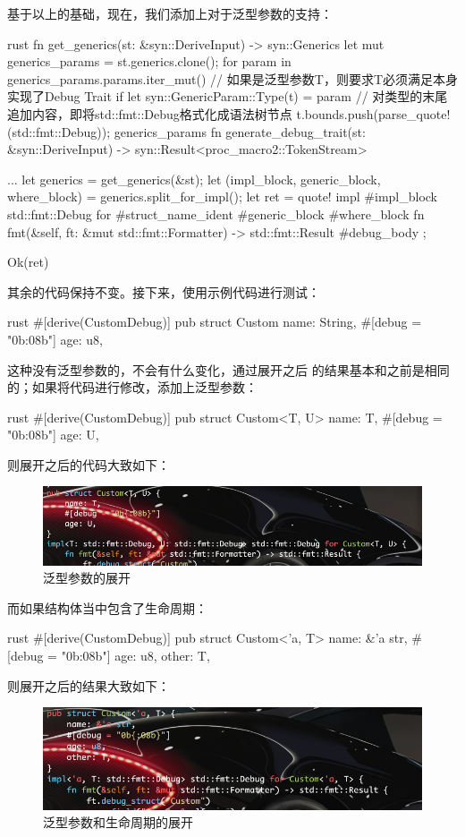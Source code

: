 基于以上的基础，现在，我们添加上对于泛型参数的支持：
\begin{code-block}{rust}
fn get_generics(st: &syn::DeriveInput) -> syn::Generics {
    let mut generics_params = st.generics.clone();
    for param in generics_params.params.iter_mut() {
        // 如果是泛型参数T，则要求T必须满足本身实现了Debug Trait
        if let syn::GenericParam::Type(t) = param {
            // 对类型的末尾追加内容，即将std::fmt::Debug格式化成语法树节点
            t.bounds.push(parse_quote!(std::fmt::Debug));
        }
    }
    generics_params
}
fn generate_debug_trait(st: &syn::DeriveInput) -> syn::Result<proc_macro2::TokenStream> {
    ...
    let generics = get_generics(&st);
    let (impl_block, generic_block, where_block) = generics.split_for_impl();
    let ret = quote! {
        impl #impl_block std::fmt::Debug for #struct_name_ident #generic_block #where_block {
            fn fmt(&self, ft: &mut std::fmt::Formatter) -> std::fmt::Result {
                #debug_body
            }
        }
    };

    Ok(ret)
}
\end{code-block}
其余的代码保持不变。接下来，使用示例代码进行测试：
\begin{code-block}{rust}
#[derive(CustomDebug)]
pub struct Custom {
    name: String,
    #[debug = "0b{:08b}"]
    age: u8,
}
\end{code-block}
这种没有泛型参数的，不会有什么变化，通过展开之后
的结果基本和之前是相同的；如果将代码进行修改，添加上泛型参数：
\begin{code-block}{rust}
#[derive(CustomDebug)]
pub struct Custom<T, U> {
    name: T,
    #[debug = "0b{:08b}"]
    age: U,
}
\end{code-block}
则展开之后的代码大致如下：
\begin{figure}[H]
  \centering
  \includegraphics[width=\linewidth]{rust_with_generic.png}
  \caption{泛型参数的展开}
  \label{fig:rust_with_generic}
\end{figure}
而如果结构体当中包含了生命周期：
\begin{code-block}{rust}
#[derive(CustomDebug)]
pub struct Custom<'a, T> {
    name: &'a str,
    #[debug = "0b{:08b}"]
    age: u8,
    other: T,
}
\end{code-block}
则展开之后的结果大致如下：
\begin{figure}[H]
  \centering
  \includegraphics[width=\linewidth]{rust_with_generic_and_lifetime.png}
  \caption{泛型参数和生命周期的展开}
  \label{fig:rust_with_generic_and_lifetime}
\end{figure}

